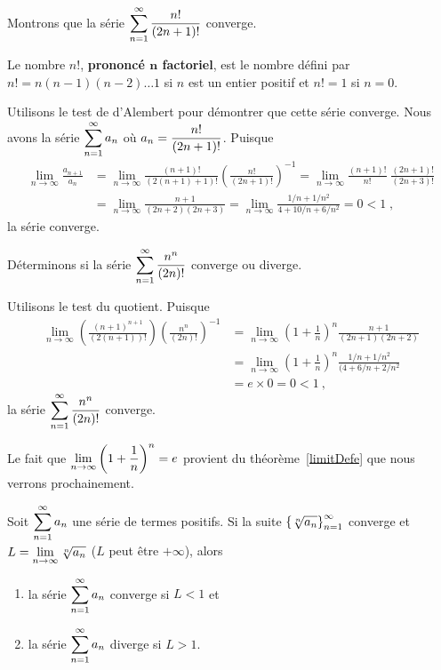 {\begin{egg}
Montrons que la série
$\displaystyle \sum_{n=1}^\infty \frac{n!}{(2n+1)!}$ converge.

Le nombre $n!$,
{\bfseries prononcé $\mathbf n$ factoriel},
est le nombre défini par $n! = n(n-1)(n-2)\ldots 1$
si $n$ est un entier positif et $n! = 1$ si $n=0$.

Utilisons le test de d'Alembert pour démontrer que cette
série converge.   Nous avons la série $\displaystyle \sum_{n=1}^\infty a_n$ où
$\displaystyle a_n = \frac{n!}{(2n+1)!}$.  Puisque
\begin{align*}
\lim_{n\rightarrow \infty} \frac{a_{n+1}}{a_n}
&= \lim_{n\rightarrow \infty} \frac{(n+1)!}{(2(n+1)+1)!}
\left(\frac{n!}{(2n+1)!}\right)^{-1}
= \lim_{n\rightarrow \infty}
\frac{(n+1)!}{n!}\;\frac{(2n+1)!}{(2n+3)!} \\
&= \lim_{n\rightarrow \infty} \frac{n+1}{(2n+2)(2n+3)}
= \lim_{n\rightarrow \infty} \frac{1/n + 1/n^2}{4 + 10/n + 6/n^2} = 0
<1 \; ,
\end{align*}
la série converge.
\end{egg}

\begin{egg}
Déterminons si la série
$\displaystyle \sum_{n=1}^\infty \frac{n^n}{(2n)!}$ converge ou diverge.

Utilisons le test du quotient.  Puisque
\begin{align*}
\lim_{n\to\infty} \left(\frac{(n+1)^{n+1}}{(2(n+1))!}\right)
\left(\frac{n^n}{(2n)!}\right)^{-1}
& = \lim_{n\to\infty} \left( 1 + \frac{1}{n}\right)^n
\frac{n+1}{(2n+1)(2n+2)}  \\
& = \lim_{n\to\infty} \left( 1 + \frac{1}{n}\right)^n
\frac{1/n + 1/n^2}{(4 + 6/n + 2/n^2}  \\
& = e \times 0 = 0 < 1 \ ,
\end{align*}
la série $\displaystyle \sum_{n=1}^\infty \frac{n^n}{(2n)!}$ converge.

Le fait que
$\displaystyle \lim_{n\to\infty} \left( 1 + \frac{1}{n}\right)^n = e$
provient du théorème~\ref{limitDefe} que nous verrons prochainement.
\end{egg}

\begin{theorem} \label{roottest}
Soit $\displaystyle \sum_{n=1}^\infty a_n$ une série de termes
positifs.  Si la suite
$\displaystyle \left\{ \sqrt[n]{a_n} \right\}_{n=1}^\infty$ converge
et $\displaystyle L = \lim_{n\rightarrow \infty} \sqrt[n]{a_n}$
($L$ peut être $+\infty$), alors
\begin{enumerate}
\item la série $\displaystyle \sum_{n=1}^\infty a_n$ converge si $L<1$ et
\item la série $\displaystyle \sum_{n=1}^\infty a_n$ diverge si $L>1$.
\end{enumerate}
\end{theorem}

}
